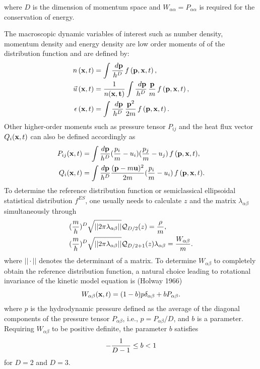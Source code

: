 \documentclass{rsproca}%
\begin{document}
where $D$ is the dimension of momentum space and $W_{\alpha \alpha} = P_{\alpha \alpha}$ is required for the conservation of energy.

The macroscopic dynamic variables of interest such as number density, momentum density and energy density are low order moments of of the distribution function and are defined by:
\begin{subequations}
\begin{align}
n\left({\bf x},t\right) &= \int{\frac{\ d{\bf p}}{h^D}}\,f\left({\bf p},{\bf x}, t\right), \\
\vec u \left({\bf x},t\right) &= {1\over n(\bf x, t) }\int{\frac{\ d{\bf p}}{h^D}\,\frac{\bf p}{m}}\,f\left({\bf p},{\bf x}, t\right), \\
{\epsilon}\left({\bf x},t\right) &= \int{\frac{\ d{\bf p}}{h^D}\,\frac{{\bf p}^2}{2m}}\,f\left({\bf p},{\bf x}, t\right).
\end{align}
\end{subequations}
Other higher-order moments such as pressure tensor $P_{ij}$ and the heat flux vector $Q_i({\bf x},t)$ can also be defined accordingly as
\begin{align}
P_{ij}({\bf x},t) &= \int{\frac{d{\bf p}}{h^D}(\frac{p_i}{m}-u_i)(\frac{p_j}{m}-u_j)\,f\,({\bf p},{\bf x},t)}, \\
Q_i({\bf x},t) &= \int{\frac{d{\bf p}}{h^D}\frac{({\bf p}-m{\bf u})^2}{2m}(\frac{p_i}{m}-u_i)\,f\,({\bf p},{\bf x},t)}.
\label{stressflux}
\end{align}
To determine the reference distribution function or semiclassical ellipsoidal statistical distribution $f^{ES}$, one usually needs to calculate $z$ and the matrix $\lambda_{\alpha \beta}$ simultaneously through
\begin{align}
&({m \over  h})^D \sqrt{ ||2 \pi \lambda_{\alpha \beta}|| } \mathcal{Q}_{D/2}(z)= {\rho \over m}, \\
&({m \over  h})^D \sqrt{ ||2 \pi \lambda_{\alpha \beta}|| } \mathcal{Q}_{D/2 +1}(z) \lambda_{\alpha \beta} = {W_{\alpha \beta} \over m} .
\end{align}
where $||\cdot ||$ denotes the determinant of a matrix.   To determine $W_{\alpha \beta}$ to completely obtain the reference distribution function, a natural choice leading to rotational invariance of the kinetic model equation is (Holway 1966)
\begin{equation}
W_{\alpha \beta}({\bf x},t) = (1 - b) p \delta_{\alpha \beta} + b P_{\alpha \beta}.
\end{equation}
where $p$ is the hydrodynamic pressure defined as the average of the diagonal components of the pressure tensor $P_{\alpha \beta}$, i.e., $p = P_{\alpha \beta}/D$, and $b$ is a parameter.  Requiring $ W_{\alpha \beta}$ to be positive definite, the parameter $b$ satisfies
\begin{align}
-{ 1\over D-1} \le b < 1
\end{align}
for $D=2$ and $D=3$.
\end{document}

